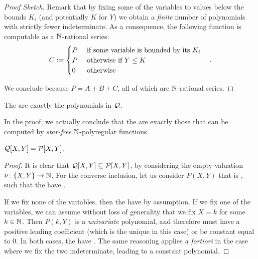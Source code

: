 \documentclass[a4paper,11pt]{article}
\begin{document}
\begin{proof}[Proof Sketch]
    Remark that by fixing some of the variables
    to values 
    below the bounds $K_i$ (and potentially $K$ for $Y$)
    we obtain a \emph{finite} number of polynomials with strictly fewer
    indeterminate.
    As a consequence, the following function is computable
    as a $\mathbb{N}$-rational series:
    \begin{equation*}
        C \mathrel{:=}
        \begin{cases}
            P & \text{ if some variable is bounded by its } K_i \\
            P & \text{ otherwise if } Y \leq K \\
            0 & \text{ otherwise }
        \end{cases}
        \quad .
    \end{equation*}

    We conclude because
    $P = A + B + C$, all of which are $\mathbb{N}$-rational series.
\end{proof}

\begin{theorem}
    \label{corrected-version:thm}
    The  are exactly
    the polynomials in $\mathcal{Q}$.
\end{theorem}

\begin{remark}
    In the proof, we actually conclude that
    the 
    are exactly those that can be computed 
    by 
    \emph{star-free} $\mathbb{N}$-polyregular functions.
\end{remark}

\begin{lemma}
    \label{lem:correct-covered-2}
    $\mathcal{Q}[X,Y] = \mathcal{P}[X,Y]$.
\end{lemma}
\begin{proof}
    It is clear that $\mathcal{Q}[X,Y] \subseteq \mathcal{P}[X,Y]$,
    by considering the empty valuation $\nu \colon \mathopen{\{} X,Y \mathclose{\}} \to \mathbb{N}$.
    For the converse inclusion, let us consider $P(X,Y)$
    that is , such that the 
    have .
   

    If we fix none of the variables, then the 
    have  by assumption. If we fix one of the
    variables, we can assume without loss of generality that we 
    fix $X = k$ for some $k \in \mathbb{N}$.
    Then $P(k,Y)$ is a  \emph{univariate} polynomial, 
    and therefore must have a positive leading coefficient
    (which is the unique  in this case)
    or be constant equal to 0. In both cases, the 
    have .
    The same reasoning applies \emph{a fortiori} in the case where
    we fix the two indeterminate, leading to a constant polynomial.
\end{proof}
\end{document}
